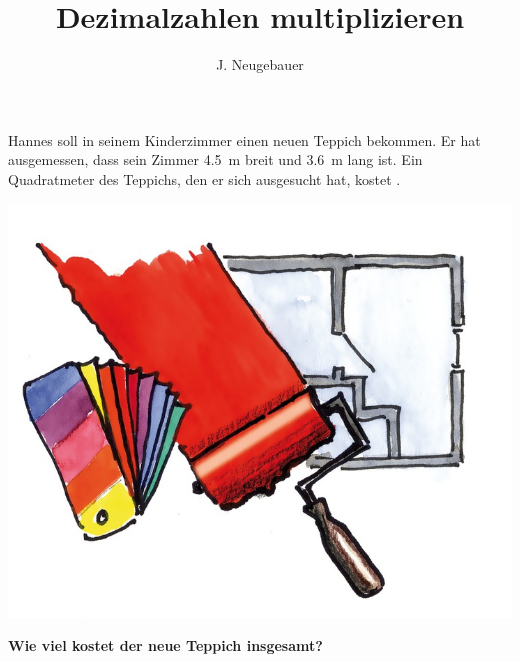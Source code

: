 \documentclass[11pt, a4paper]{scrartcl}
\author{J. Neugebauer}
\title{Dezimalzahlen multiplizieren}
\date{\Heute}
\begin{document}
	\LARGE

	Hannes soll in seinem Kinderzimmer einen neuen Teppich bekommen. Er hat ausgemessen, dass sein Zimmer \SI{4,5}{\meter} breit und \SI{3,6}{\meter} lang ist. Ein Quadratmeter des Teppichs, den er sich ausgesucht hat, kostet .
	
	\begin{center}
	\includegraphics{6-AB.III.4-Abb_Renovieren}
	
	\textbf{Wie viel kostet der neue Teppich insgesamt?}
	\end{center}
	
\end{document}
